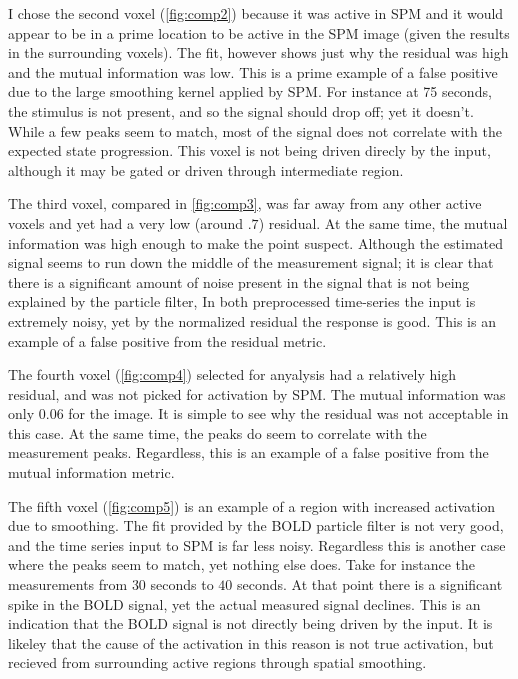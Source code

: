 I chose the second voxel (\autoref{fig:comp2}) because it was active in SPM and it would appear to be in a prime
location to be active in the SPM image (given the results in the surrounding voxels). The fit,
however shows just why the residual was high and the mutual information was low. This is a
prime example of a false positive due to the large smoothing kernel applied by SPM. 
For instance at 75 seconds, the stimulus is not present, and so the signal should drop off; yet
it doesn't. While a few peaks seem to match, most of the signal does not correlate with the
expected state progression. This voxel is not being driven direcly by the input, although it
may be gated or driven through intermediate region. 

The third voxel, compared in \autoref{fig:comp3}, was far away from any other active voxels 
and yet had a very low (around $.7$) residual. At the same time, the mutual information was
high enough to make the point suspect. Although the estimated signal seems to run down the
middle of the measurement signal; it is clear that there is a significant amount of noise
present in the signal that is not being explained by the particle filter, 
In both preprocessed time-series the input is extremely noisy, yet by the normalized residual 
the response is good. This is an example of a false positive from the residual metric. 

The fourth voxel (\autoref{fig:comp4}) selected for anyalysis had a relatively high residual, and was not picked
for activation by SPM. The mutual information was only $0.06$
for the image. It is simple to see why the residual was not acceptable in this case.
At the same time, the peaks do seem to correlate with the measurement peaks. Regardless,
this is an example of a  false positive from the mutual information metric. 

The fifth voxel (\autoref{fig:comp5}) is an example of a region with increased activation
due to smoothing. The fit provided by the BOLD particle filter is not very good, and the time
series input to SPM is far less noisy. Regardless this is another case where the peaks
seem to match, yet nothing else does. Take for instance the measurements from $30$ seconds
to $40$ seconds. At that point there is a significant spike in the BOLD signal, yet the
actual measured signal declines. This is an indication that the BOLD signal is not directly
being driven by the input. It is likeley that the cause of the activation in this reason is
not true activation, but recieved from surrounding active regions through spatial smoothing. 

